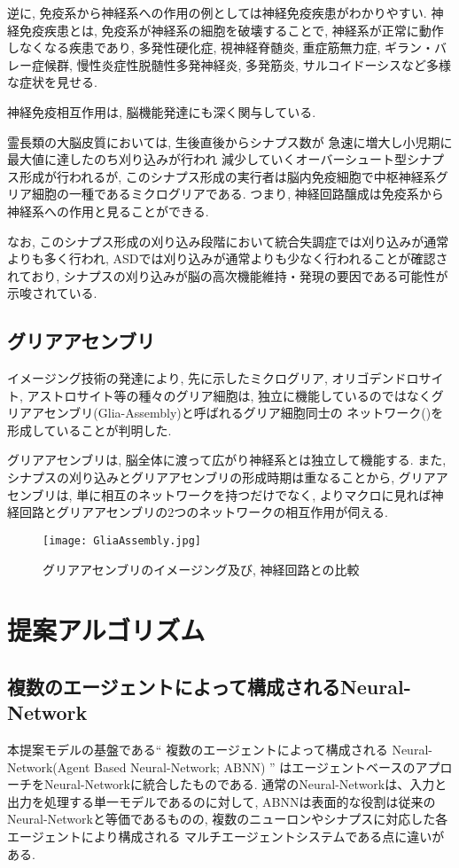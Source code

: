 逆に, 免疫系から神経系への作用の例としては神経免疫疾患がわかりやすい.
神経免疫疾患とは, 免疫系が神経系の細胞を破壊することで, 神経系が正常に動作しなくなる疾患であり, 
多発性硬化症, 
視神経脊髄炎, 
重症筋無力症, 
ギラン・バレー症候群, 
慢性炎症性脱髄性多発神経炎, 
多発筋炎,
サルコイドーシスなど多様な症状を見せる.

神経免疫相互作用は, 脳機能発達にも深く関与している.

霊長類の大脳皮質においては, 生後直後からシナプス数が
急速に増大し小児期に最大値に達したのち刈り込みが行われ
減少していくオーバーシュート型シナプス形成が行われるが, 
このシナプス形成の実行者は脳内免疫細胞で中枢神経系グリア細胞の一種であるミクログリアである.
つまり, 神経回路醸成は免疫系から神経系への作用と見ることができる.

なお, このシナプス形成の刈り込み段階において統合失調症では刈り込みが通常よりも多く行われ, 
ASDでは刈り込みが通常よりも少なく行われることが確認されており, 
シナプスの刈り込みが脳の高次機能維持・発現の要因である可能性が示唆されている.
\section{グリアアセンブリ}
イメージング技術の発達により, 
先に示したミクログリア, オリゴデンドロサイト, アストロサイト等の種々のグリア細胞は,
独立に機能しているのではなくグリアアセンブリ(Glia-Assembly)と呼ばれるグリア細胞同士の
ネットワーク()を形成していることが判明した.\cite{GliaAssembly}

グリアアセンブリは, 脳全体に渡って広がり神経系とは独立して機能する.
また, シナプスの刈り込みとグリアアセンブリの形成時期は重なることから, 
グリアアセンブリは, 単に相互のネットワークを持つだけでなく,
よりマクロに見れば神経回路とグリアアセンブリの2つのネットワークの相互作用が伺える.
\begin{figure}[H]
\centering
\texttt{[image: GliaAssembly.jpg]}
\caption{グリアアセンブリのイメージング及び, 神経回路との比較\cite{GliaAssembly}}  
\end{figure}
\chapter{提案アルゴリズム}
\section{複数のエージェントによって構成されるNeural-Network}
本提案モデルの基盤である`` 複数のエージェントによって構成される
Neural-Network(Agent Based Neural-Network; ABNN) ''
はエージェントベースのアプローチをNeural-Networkに統合したものである.
通常のNeural-Networkは、入力と出力を処理する単一モデルであるのに対して, 
ABNNは表面的な役割は従来のNeural-Networkと等価であるものの, 
複数のニューロンやシナプスに対応した各エージェントにより構成される
マルチエージェントシステムである点に違いがある.


